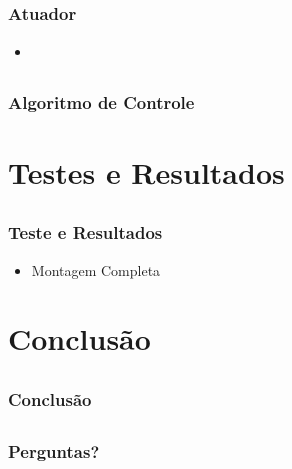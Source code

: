 \documentclass{beamer}
\begin{document}
\subsection{}
\begin{frame}
  \frametitle{Atuador}
  \begin{itemize}
   \item 
  \end{itemize}

\end{frame}

\subsection{}
\begin{frame}[plain]
\begin{figure}
 \centering
   \hfil
   \hfil
\end{figure}
\end{frame}



\subsection{}
\begin{frame}
 \frametitle{Algoritmo de Controle}
\end{frame}

\section{Testes e Resultados}
\subsection{}
\begin{frame}
 \frametitle{Teste e Resultados}

  \begin{itemize}
   \item Montagem Completa
  \end{itemize}

\end{frame}

\section{Conclusão}
\subsection{}
\begin{frame}
 \frametitle{Conclusão}

  
\end{frame}

\subsection{}
\begin{frame}
 \frametitle{Perguntas?}
\end{frame}
\end{document}
